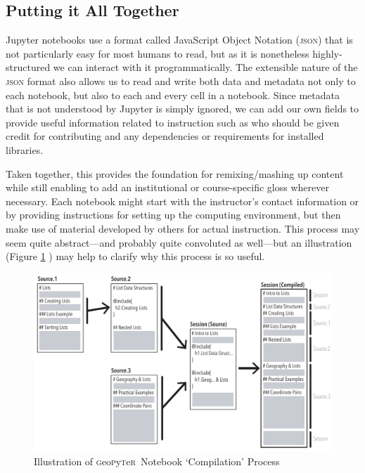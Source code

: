 \documentclass[letter, 11pt,titlepage]{article}
\newcommand{\gp}{\textsc{g}eo\textsc{p}y\textsc{t}e\textsc{r}~\/}
\begin{document}
\subsection{Putting it All Together}

Jupyter notebooks use a format called JavaScript Object Notation (\textsc{json}) that is not particularly easy for most humans to read, but as it is nonetheless highly-structured we can interact with it programmatically. The extensible nature of the \textsc{json} format also allows us to read and write both data and metadata not only to each notebook, but also to each and every cell in a notebook. Since metadata that is not understood by Jupyter is simply ignored, we can add our own fields to provide useful information related to instruction such as who should be given credit for contributing and any dependencies or requirements for installed libraries.

Taken together, this provides the foundation for remixing/mashing up content while still enabling to add an institutional or course-specific gloss wherever necessary. Each notebook might start with the instructor's contact information or by providing instructions for setting up the computing environment, but then make use of material developed by others for actual instruction. This process may seem quite abstract---and probably quite convoluted as well---but an illustration (Figure \ref{fig:compiling} ) may help to clarify why this process is so useful.

\begin{figure}[hbtp]
  \centering
  \caption{Illustration of \gp Notebook `Compilation' Process}
  \label{fig:compiling}
  \includegraphics[width=\textwidth, angle=0]{Multiple_Documents.pdf}
\end{figure}
\end{document}
